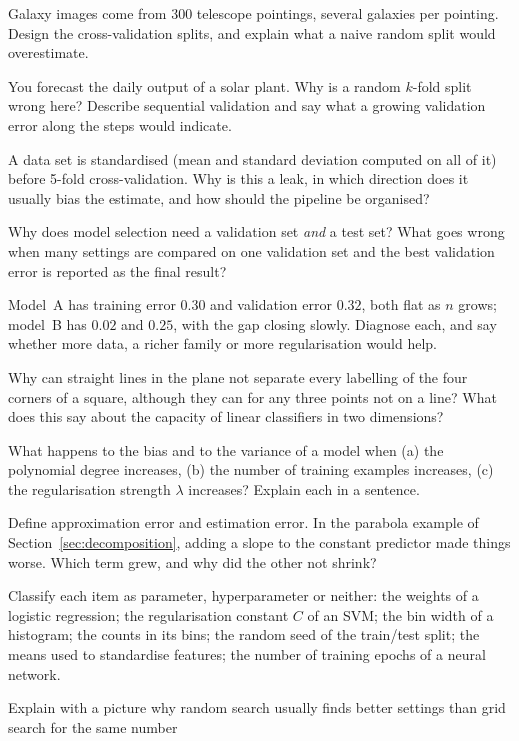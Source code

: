 \documentclass[11pt]{article}
\begin{document}
\begin{questions}
\begin{conceptual}
\item Galaxy images come from 300 telescope pointings, several galaxies per pointing. Design the cross-validation
splits, and explain what a naive random split would overestimate.
\item You forecast the daily output of a solar plant. Why is a random $k$-fold split wrong here? Describe sequential
validation and say what a growing validation error along the steps would indicate.
\item A data set is standardised (mean and standard deviation computed on all of it) before 5-fold cross-validation.
Why is this a leak, in which direction does it usually bias the estimate, and how should the pipeline be organised?
\item Why does model selection need a validation set \emph{and} a test set? What goes wrong when many settings are
compared on one validation set and the best validation error is reported as the final result?
\item Model~A has training error $0.30$ and validation error $0.32$, both flat as $n$ grows; model~B has $0.02$ and
$0.25$, with the gap closing slowly. Diagnose each, and say whether more data, a richer family or more regularisation
would help.
\item Why can straight lines in the plane not separate every labelling of the four corners of a square, although they
can for any three points not on a line? What does this say about the capacity of linear classifiers in two dimensions?
\item What happens to the bias and to the variance of a model when (a) the polynomial degree increases, (b) the
number of training examples increases, (c) the regularisation strength $\lambda$ increases? Explain each in a
sentence.
\item Define approximation error and estimation error. In the parabola example of Section~\ref{sec:decomposition},
adding a slope to the constant predictor made things worse. Which term grew, and why did the other not shrink?
\item Classify each item as parameter, hyperparameter or neither: the weights of a logistic regression; the
regularisation constant $C$ of an SVM; the bin width of a histogram; the counts in its bins; the random seed of the
train/test split; the means used to standardise features; the number of training epochs of a neural network.
\item Explain with a picture why random search usually finds better settings than grid search for the same number

\end{conceptual}
\end{questions}
\end{document}
